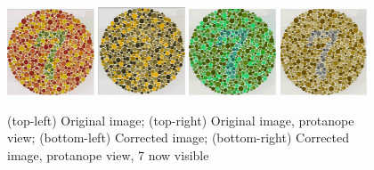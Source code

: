 \documentclass[10pt,twocolumn,letterpaper]{article}
\begin{document}
\begin{figure}[h]
  \includegraphics[width=0.23\textwidth]{isihara1.png}
  \includegraphics[width=0.23\textwidth]{isihara2.png}
  \includegraphics[width=0.23\textwidth]{isihara3.png}
  \includegraphics[width=0.23\textwidth]{isihara4.png}
  \caption{(top-left) Original image; (top-right) Original image, protanope view; (bottom-left) Corrected image; (bottom-right) Corrected image, protanope view, 7 now visible}
  \label{fig:isihara}
\end{figure}
\end{document}
